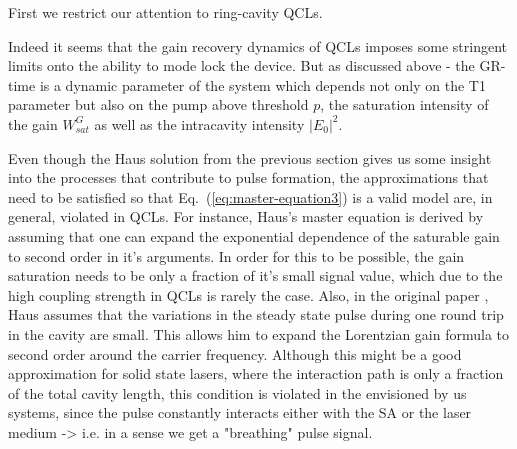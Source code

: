 \documentclass[preprint,secnumarabic,amssymb, nobibnotes, aip, prd]{revtex4-1}
\begin{document}
First we restrict our attention to ring-cavity QCLs.

Indeed it seems that the gain recovery dynamics of QCLs imposes some stringent limits onto the ability to mode lock the device. But as discussed above - the GR-time is a dynamic parameter of the system which depends not only on the T1 parameter but also on the pump above threshold $p$, the saturation intensity of the gain $W_{sat}^G$ as well as the intracavity intensity $|E_0|^2$. 

Even though the Haus solution from the previous section gives us some insight into the processes that contribute to pulse formation, the approximations that need to be satisfied so that Eq.~(\ref{eq:master-equation3}) is a valid model are, in general, violated in QCLs. For instance, Haus's master equation is derived by assuming that one can expand the exponential dependence of the saturable gain to second order in it's arguments. 
In order for this to be possible, the gain saturation needs to be only a fraction of it's small signal value, which due to the high coupling strength in QCLs is rarely the case. Also, in the original paper \cite{haus1975theory,haus1975theoryslow}, Haus assumes that the variations in the steady state pulse during one round trip in the cavity are small. This allows him to expand the Lorentzian gain formula to second order around the carrier frequency. Although this might be a good approximation for solid state lasers, where the interaction path is only a fraction of the total cavity length, this condition is violated in the envisioned by us systems, since the pulse constantly interacts either with the SA or the laser medium -> i.e. in a sense we get a "breathing" pulse signal. 
\end{document}
